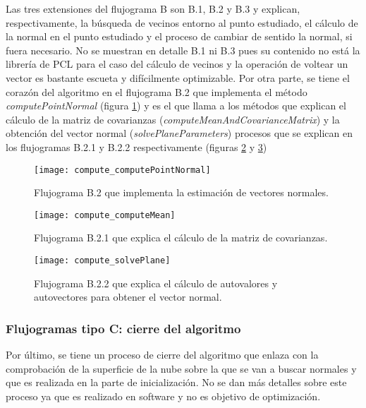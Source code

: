 Las tres extensiones del flujograma B son B.1, B.2 y B.3 y explican, respectivamente, la búsqueda de vecinos entorno al punto estudiado, el cálculo de la normal en el punto estudiado y el proceso de cambiar de sentido la normal, si fuera necesario. No se muestran en detalle B.1 ni B.3 pues su contenido no está la librería de PCL para el caso del cálculo de vecinos y la operación de voltear un vector es bastante escueta y difícilmente optimizable. Por otra parte, se tiene el corazón del algoritmo en el flujograma B.2 que implementa el método \textit{computePointNormal} (figura \ref{fig:compute_computePointNormal}) y es el que llama a los métodos que explican el cálculo de la matriz de covarianzas (\textit{computeMeanAndCovarianceMatrix}) y la obtención del vector normal (\textit{solvePlaneParameters}) procesos que se explican en los flujogramas B.2.1 y B.2.2 respectivamente (figuras \ref{fig:compute_computeMean} y \ref{fig:compute_solvePlane})





\begin{figure}[h!]
\centering
\texttt{[image: compute\_computePointNormal]}
\caption{Flujograma B.2 que implementa la estimación de vectores normales.}\label{fig:compute_computePointNormal}
\end{figure}


\begin{figure}[h!]
\centering
\texttt{[image: compute\_computeMean]}
\caption{Flujograma B.2.1 que explica el cálculo de la matriz de covarianzas.}\label{fig:compute_computeMean}
\end{figure}


\begin{figure}[h!]
\centering
\texttt{[image: compute\_solvePlane]}
\caption{Flujograma B.2.2 que explica el cálculo de autovalores y autovectores para obtener el vector normal.}\label{fig:compute_solvePlane}
\end{figure}



\subsubsection{Flujogramas tipo C: cierre del algoritmo}
Por último, se tiene un proceso de cierre del algoritmo que enlaza con la comprobación de la superficie de la nube sobre la que se van a buscar normales y que es realizada en la parte de inicialización. No se dan más detalles sobre este proceso ya que es realizado en software y no es objetivo de optimización.


